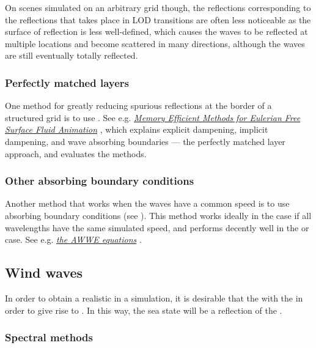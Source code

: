 On scenes simulated on an arbitrary grid though, the reflections corresponding to the reflections that takes place in LOD transitions are often less noticeable as the surface of reflection is less well-defined, which causes the waves to be reflected at multiple locations and become scattered in many directions, although the waves are still eventually totally reflected.

\subsubsection{Perfectly matched layers}

One method for greatly reducing spurious reflections at the border of a structured grid is to use . See e.g. \textit{\href{http://liu.diva-portal.org/smash/get/diva2:359805/FULLTEXT01}{Memory Efficient Methods for Eulerian Free Surface Fluid Animation}} \citep{temp}, which explains explicit dampening, implicit dampening, and wave absorbing boundaries --- the perfectly matched layer approach, and evaluates the methods.

\subsubsection{Other absorbing boundary conditions}

Another method that works when the waves have a common speed is to use absorbing boundary conditions (see \citep{temp}). This method works ideally in the  case if all wavelengths have the same simulated speed, and performs decently well in the  or  case. See e.g. \textit{\href{http://www.ce.ncsu.edu/centers/cmg/AWWE/}{the AWWE equations}} \citep{temp}.
\subsection{Wind waves}

In order to obtain a realistic  in a simulation, it is desirable that the  \interacts with the \wind in order to give rise to . In this way, the sea state will be a reflection of the .

\subsubsection{Spectral methods}

